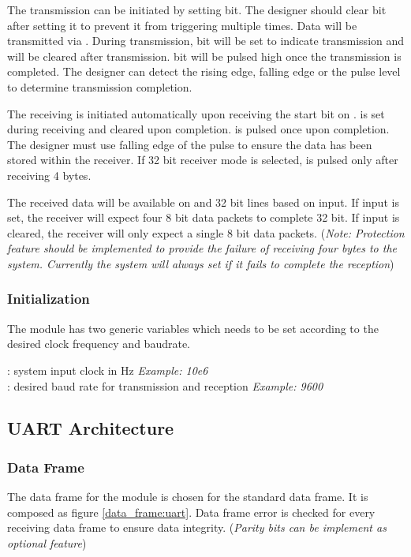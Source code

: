 The transmission can be initiated by setting  bit. The designer should clear  bit after setting it to prevent it from triggering multiple times. Data will be transmitted via . During transmission,  bit will be set to indicate transmission and will be cleared after transmission.  bit will be pulsed high once the transmission is completed. The designer can detect the rising edge, falling edge or the pulse level to determine transmission completion.

The receiving is initiated automatically upon receiving the start bit on .  is set during receiving and cleared upon completion.  is pulsed once upon completion.  The designer must use falling edge of the pulse to ensure the data has been stored within the receiver. If 32 bit receiver mode is selected,  is pulsed only after receiving 4 bytes.

The received data will be available on  and 32 bit  lines based on  input. If  input is set, the receiver will expect four 8 bit data packets to complete 32 bit. If  input is cleared, the receiver will only expect a single 8 bit data packets. (\textit{Note: Protection feature should be implemented to provide the failure of receiving four bytes to the system. Currently the system will always set  if it fails to complete the reception})

\subsubsection{Initialization}
The module has two generic variables which needs to be set according to the desired clock frequency and baudrate.

\noindent {} : system input clock in Hz \textit{Example: 10e6}\\
 : desired baud rate for transmission and reception \textit{Example: 9600}

\subsection{UART Architecture}
\subsubsection{Data Frame}
The data frame for the module is chosen for the standard data frame. It is composed as figure \ref{data_frame:uart}. Data frame error is checked for every receiving data frame to ensure data integrity. (\textit{Parity bits can be implement as optional feature})

